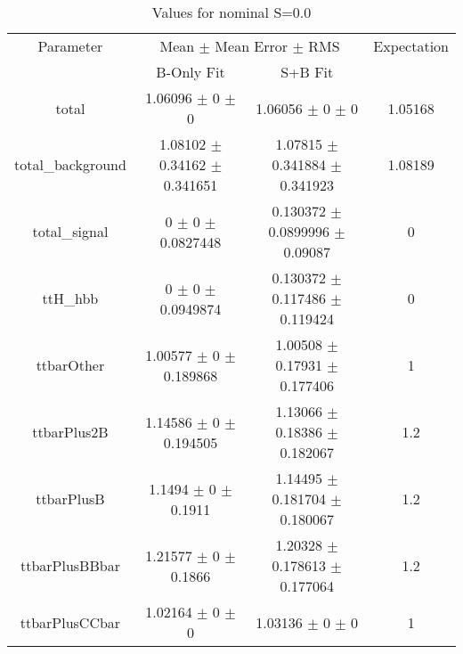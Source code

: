 \begin{table}
\centering
\caption{Values for nominal S=0.0}
\begin{tabular}{cccc}
\toprule
Parameter & \multicolumn{2}{c}{Mean $\pm$ Mean Error $\pm$ RMS} & Expectation\\
 & B-Only Fit & S+B Fit & \\
\midrule
total & \num{1.06096} $\pm$ \num{0} $\pm$ \num{0} & \num{1.06056} $\pm$ \num{0} $\pm$ \num{0} & \num{1.05168}\\
total\_background & \num{1.08102} $\pm$ \num{0.34162} $\pm$ \num{0.341651} & \num{1.07815} $\pm$ \num{0.341884} $\pm$ \num{0.341923} & \num{1.08189}\\
total\_signal & \num{0} $\pm$ \num{0} $\pm$ \num{0.0827448} & \num{0.130372} $\pm$ \num{0.0899996} $\pm$ \num{0.09087} & \num{0}\\
ttH\_hbb & \num{0} $\pm$ \num{0} $\pm$ \num{0.0949874} & \num{0.130372} $\pm$ \num{0.117486} $\pm$ \num{0.119424} & \num{0}\\
ttbarOther & \num{1.00577} $\pm$ \num{0} $\pm$ \num{0.189868} & \num{1.00508} $\pm$ \num{0.17931} $\pm$ \num{0.177406} & \num{1}\\
ttbarPlus2B & \num{1.14586} $\pm$ \num{0} $\pm$ \num{0.194505} & \num{1.13066} $\pm$ \num{0.18386} $\pm$ \num{0.182067} & \num{1.2}\\
ttbarPlusB & \num{1.1494} $\pm$ \num{0} $\pm$ \num{0.1911} & \num{1.14495} $\pm$ \num{0.181704} $\pm$ \num{0.180067} & \num{1.2}\\
ttbarPlusBBbar & \num{1.21577} $\pm$ \num{0} $\pm$ \num{0.1866} & \num{1.20328} $\pm$ \num{0.178613} $\pm$ \num{0.177064} & \num{1.2}\\
ttbarPlusCCbar & \num{1.02164} $\pm$ \num{0} $\pm$ \num{0} & \num{1.03136} $\pm$ \num{0} $\pm$ \num{0} & \num{1}\\
\bottomrule
\end{tabular}
\end{table}